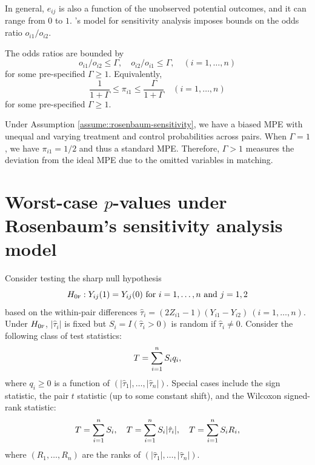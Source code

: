 In general, $e_{ij}$ is also a function of the unobserved potential outcomes, and it can range from $0$ to $1$. 
\citet{rosenbaum1987sensitivity}'s model for sensitivity analysis imposes bounds on the odds ratio $o_{i1}/o_{i2} $. 

\begin{assumption}\label{assume::rosenbaum-sensitivity}
The odds ratios are bounded by 
$$
o_{i1}/o_{i2} \leq \Gamma,\quad
o_{i2}/o_{i1} \leq \Gamma, \quad (i=1, \ldots, n)
$$
for some pre-specified $\Gamma \geq  1$. Equivalently, 
$$ 
\frac{1}{1+\Gamma } \leq 
\pi_{i1} \leq \frac{\Gamma}{1+\Gamma} \quad (i=1, \ldots, n)
$$
for some pre-specified $\Gamma \geq  1$.
\end{assumption}


Under Assumption \ref{assume::rosenbaum-sensitivity}, we have a biased MPE with unequal and varying treatment and control probabilities across pairs. When $\Gamma = 1$,  we have $\pi_{i1} = 1/2 $ and thus a standard MPE. Therefore, $\Gamma > 1$ measures the deviation from the ideal MPE due to the omitted variables in matching. 
 
 
 
 \section{Worst-case $p$-values under Rosenbaum's sensitivity analysis model}


Consider testing the sharp null hypothesis 
$$
H_{0\textsc{f}}: Y_{ij}(1) = Y_{ij}(0) \text{ for } i = 1,\ldots, n \text{ and } j=1,2
$$
based on the within-pair differences
$
\hat{\tau}_i = (2Z_{i1} - 1) (Y_{i1} - Y_{i2}) \  (i=1,\ldots, n). 
$
Under $H_{0\textsc{f}}$, $|\hat{\tau}_i|$ is fixed but $S_i = I(\hat{\tau}_i > 0)$ is random if $\hat{\tau}_i \neq 0$. Consider the following class of test statistics:
$$
T = \sum_{i=1}^n S_i q_i,
$$
where $q_i\geq 0$ is a function of $ (|\hat{\tau}_1|, \ldots, |\hat{\tau}_n|   ).$ Special cases include the sign statistic, the pair $t$ statistic (up to some constant shift), and the Wilcoxon signed-rank statistic:
$$
T = \sum_{i=1}^n S_i,\quad T = \sum_{i=1}^n S_i |\hat{\tau}_i|,\quad T = \sum_{i=1}^n S_i R_i,
$$
where $(R_1,\ldots, R_n)$ are the ranks of $ (|\hat{\tau}_1|, \ldots, |\hat{\tau}_n|   ).$ 

